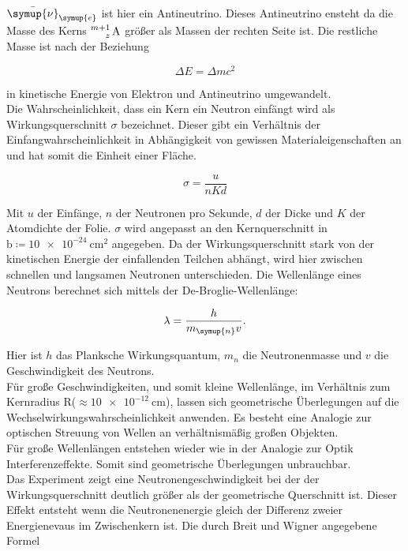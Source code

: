 \noindent $\bar{\symup{\nu}}_{\symup{e}}$ ist hier ein Antineutrino. Dieses Antineutrino ensteht da die Masse des Kerns $\ce{^{m+1}_z \text{A}}$ 
größer als Massen der rechten Seite ist. Die restliche Masse ist nach der Beziehung

\begin{equation*}
   \Delta E = \Delta m c^2 \nonumber
\end{equation*}

\noindent in kinetische Energie von Elektron und Antineutrino umgewandelt.\\
Die Wahrscheinlichkeit, dass ein Kern ein Neutron einfängt wird als Wirkungsquerschnitt $\sigma$ bezeichnet. Dieser gibt ein Verhältnis der 
Einfangwahrscheinlichkeit in Abhängigkeit von gewissen Materialeigenschaften an und hat somit die Einheit einer Fläche.

\begin{equation*}
   \sigma = \frac{u}{nKd} \nonumber
\end{equation*}

\noindent Mit $u$ der Einfänge, $n$ der Neutronen pro Sekunde, $d$ der Dicke und $K$ der Atomdichte der Folie. $\sigma$ wird angepasst an den 
Kernquerschnitt in $\si{\barn} \coloneqq \SI{10e-24}{\centi\metre\squared}$ angegeben. Da der Wirkungsquerschnitt stark von der kinetischen Energie 
der einfallenden Teilchen abhängt, wird hier zwischen schnellen und langsamen Neutronen unterschieden. Die Wellenlänge eines Neutrons 
berechnet sich mittels der De-Broglie-Wellenlänge:

\begin{equation*}
   \lambda = \frac{h}{m_{\symup{n}}v}. \nonumber
\end{equation*}

\noindent Hier ist $h$ das Planksche Wirkungsquantum, $m_n$ die Neutronenmasse und $v$ die Geschwindigkeit des Neutrons.\\
Für große Geschwindigkeiten, 
und somit kleine Wellenlänge, im Verhältnis zum Kernradius R($\approx \SI{10e-12}{\centi\meter}$), lassen sich geometrische Überlegungen auf die 
Wechselwirkungswahrscheinlichkeit anwenden. Es besteht eine Analogie zur optischen Streuung von Wellen an verhältnismäßig großen Objekten. \\
­Für große Wellenlängen entstehen wieder wie in der Analogie zur Optik Interferenzeffekte. Somit sind geometrische Überlegungen unbrauchbar.\\
Das Experiment zeigt eine Neutronengeschwindigkeit bei der der Wirkungsquerschnitt deutlich größer als der geometrische Querschnitt ist. Dieser Effekt
entsteht wenn die Neutronenenergie gleich der Differenz zweier Energienevaus im Zwischenkern ist. 
Die durch Breit und Wigner angegebene Formel

